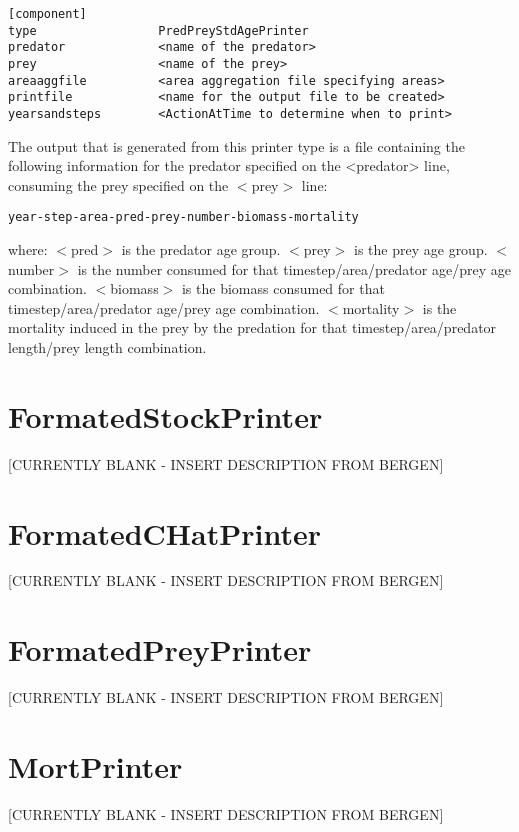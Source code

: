 \documentclass [a4paper, 10pt]{book}
\begin{document}
\begin{verbatim}
[component]
type                 PredPreyStdAgePrinter
predator             <name of the predator>
prey                 <name of the prey>
areaaggfile          <area aggregation file specifying areas>
printfile            <name for the output file to be created>
yearsandsteps        <ActionAtTime to determine when to print>
\end{verbatim}

The output that is generated from this printer type is a file containing the following information for the predator specified on the <predator> line, consuming the prey specified on the $<$prey$>$ line:

\begin{verbatim}
year-step-area-pred-prey-number-biomass-mortality
\end{verbatim}

where:\newline
$<$pred$>$ is the predator age group.\newline
$<$prey$>$ is the prey age group.\newline
$<$number$>$ is the number consumed for that timestep/area/predator age/prey age combination.\newline
$<$biomass$>$ is the biomass consumed for that timestep/area/predator age/prey age combination.\newline
$<$mortality$>$ is the mortality induced in the prey by the predation for that timestep/area/predator length/prey length combination.

\section{FormatedStockPrinter}\label{sec:formatedstockprinter}
[CURRENTLY BLANK - INSERT DESCRIPTION FROM BERGEN]

\section{FormatedCHatPrinter}\label{sec:formatedchatprinter}
[CURRENTLY BLANK - INSERT DESCRIPTION FROM BERGEN]

\section{FormatedPreyPrinter}\label{sec:formatedpreyprinter}
[CURRENTLY BLANK - INSERT DESCRIPTION FROM BERGEN]

\section{MortPrinter}\label{sec:mortprinter}
[CURRENTLY BLANK - INSERT DESCRIPTION FROM BERGEN]
\end{document}
